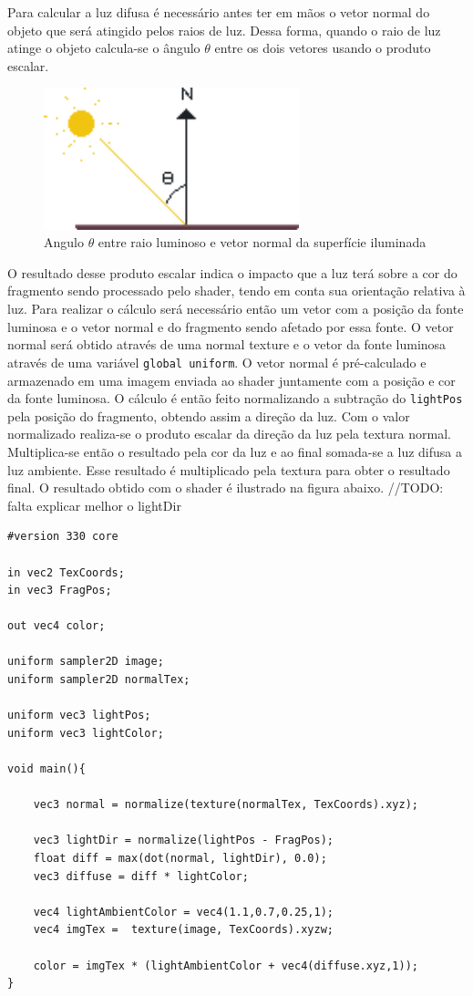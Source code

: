 \documentclass[12pt, 
openright, 
oneside, 
a4paper,    
brazil]{facom-ufu-abntex2}
\begin{document}
Para calcular a luz difusa é necessário antes ter em mãos o vetor normal do objeto que será atingido pelos raios de luz. Dessa forma, quando o raio de luz atinge o objeto calcula-se o ângulo $\theta$ entre os dois vetores usando o produto escalar.

\begin{figure}[H]
	\centering
	\includegraphics[width=20em]{imagens/normal_reflection.png}
	\caption{Angulo $\theta$ entre raio luminoso e vetor normal da superfície iluminada}
\end{figure}

O resultado desse produto escalar indica o impacto que a luz terá sobre a cor do fragmento sendo processado pelo shader, tendo em conta sua orientação relativa à luz. Para realizar o cálculo será necessário  então um vetor com a posição da fonte luminosa e o vetor normal e do fragmento sendo afetado por essa fonte.
O vetor normal será obtido através de uma normal texture e o vetor da fonte luminosa através de uma variável \texttt{global uniform}. O vetor normal é pré-calculado e armazenado em uma imagem enviada ao shader juntamente com a posição e cor da fonte luminosa. O cálculo é então feito normalizando a subtração do \texttt{lightPos} pela posição do fragmento, obtendo assim a direção da luz. Com o valor normalizado realiza-se o produto escalar da direção da luz pela textura normal. Multiplica-se então o resultado pela cor da luz e ao final somada-se a luz difusa a luz ambiente. Esse resultado é multiplicado pela textura para obter o resultado final. O resultado obtido com o shader é ilustrado na figura abaixo.
//TODO: falta explicar melhor o lightDir

\begin{lstlisting}[caption=Fragment Shader com luz ambiente e difusa]
#version 330 core

in vec2 TexCoords;
in vec3 FragPos;  

out vec4 color;

uniform sampler2D image;
uniform sampler2D normalTex;

uniform vec3 lightPos; 
uniform vec3 lightColor;

void main(){

	vec3 normal = normalize(texture(normalTex, TexCoords).xyz);

	vec3 lightDir = normalize(lightPos - FragPos);
	float diff = max(dot(normal, lightDir), 0.0);
	vec3 diffuse = diff * lightColor;
	
	vec4 lightAmbientColor = vec4(1.1,0.7,0.25,1);
	vec4 imgTex =  texture(image, TexCoords).xyzw;
	
	color = imgTex * (lightAmbientColor + vec4(diffuse.xyz,1));
}
\end{lstlisting}
\end{document}
